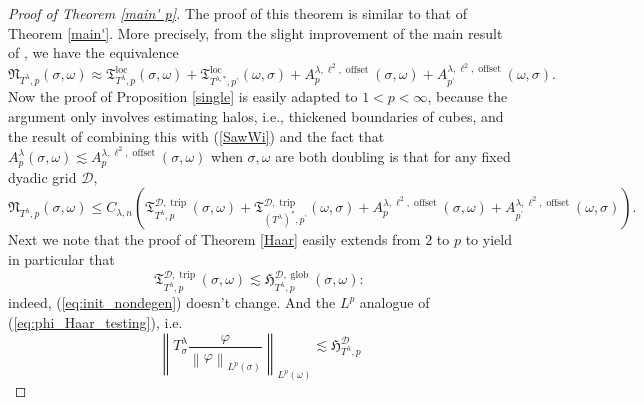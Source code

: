 \documentclass{amsart}%
\theoremstyle{plain}
\numberwithin{equation}{section}
\begin{document}
\begin{proof}
[Proof of Theorem \ref{main' p}]The proof of this theorem is similar to that
of Theorem \ref{main'}. More precisely, from the slight improvement
\cite[Theorem 1]{AlLuSaUr3} of the main result of \cite{SaWi}, we have the
equivalence
\begin{equation}
\mathfrak{N}_{T^{\lambda},p}\left(  \sigma,\omega\right)  \approx
\mathfrak{T}_{T^{\lambda},p}^{\operatorname{loc}}\left(  \sigma,\omega\right)
+\mathfrak{T}_{T^{\lambda,\ast},p^{\prime}}^{\operatorname{loc}}\left(
\omega,\sigma\right)  +A_{p}^{\lambda,\ell^{2},\operatorname*{offset}}\left(
\sigma,\omega\right)  +A_{p^{\prime}}^{\lambda,\ell^{2},\operatorname*{offset}%
}\left(  \omega,\sigma\right)  .\label{SawWi}%
\end{equation}
Now the proof of Proposition \ref{single} is easily adapted to $1<p<\infty$,
because the argument only involves estimating halos, i.e., thickened boundaries of cubes, and the result of
combining this with (\ref{SawWi}) and the fact that $A_{p}^{\lambda}%
(\sigma,\omega)\lesssim A_{p}^{\lambda,\ell^{2},\operatorname*{offset}}%
(\sigma,\omega)$ when $\sigma,\omega$ are both doubling is that for any fixed
dyadic grid $\mathcal{D}$,
	\begin{equation}\label{eq:p_dyadic_T1}
\mathfrak{N}_{T^{\lambda},p}\left(  \sigma,\omega\right)  \leq C_{\lambda
,n}\left(  \mathfrak{T}_{T^{\lambda},p}^{\mathcal{D},\operatorname*{trip}%
}\left(  \sigma,\omega\right)  +\mathfrak{T}_{\left(  T^{\lambda}\right)
^{\ast},p^{\prime}}^{\mathcal{D},\operatorname*{trip}}\left(  \omega
,\sigma\right)  +A_{p}^{\lambda,\ell^{2},\operatorname*{offset}}\left(
\sigma,\omega\right)  +A_{p^{\prime}}^{\lambda,\ell^{2},\operatorname*{offset}%
}\left(  \omega,\sigma\right)  \right)  .
	\end{equation}
Next we note that the proof of Theorem \ref{Haar} easily extends from $2$ to
$p$ to yield in particular that
	\begin{equation}\label{eq:Haar_p_interval_less_haar}
\mathfrak{T}_{T^{\lambda},p}^{\mathcal{D},\operatorname*{trip}}\left(
\sigma,\omega\right)  \lesssim\mathfrak{H}_{T^{\lambda},p}^{\mathcal{D}%
,\operatorname*{glob}}\left(  \sigma,\omega\right)  :
	\end{equation}
indeed, (\ref{eq:init_nondegen}) doesn't change. And the $L^{p}$ analogue of
(\ref{eq:phi_Haar_testing}), i.e.
	\[
		\left \|  T^{\lambda } _{\sigma}  \frac{\varphi}{\left \|  \varphi \right \|_{L^p (\sigma)}} \right \|_{L^p (\omega)} \lesssim \mathfrak{H}_{T^{\lambda},p}^{\mathcal{D}%
}\]
\end{proof}
\end{document}

